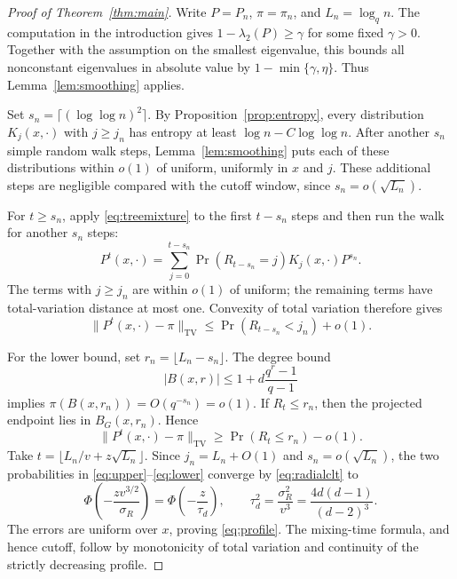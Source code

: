 \documentclass[11pt,reqno]{amsart}
\theoremstyle{definition}
\newcommand{\TV}{\mathrm{TV}}
\begin{document}
\begin{proof}[Proof of Theorem~\ref{thm:main}]
Write $P=P_n$, $\pi=\pi_n$, and $L_n=\log_q n$.
The computation in the introduction gives
$1-\lambda_2(P)\ge\gamma$ for some fixed $\gamma>0$.
Together with the assumption on the smallest eigenvalue, this
bounds all nonconstant eigenvalues in absolute value by
$1-\min\{\gamma,\eta\}$. Thus Lemma~\ref{lem:smoothing} applies.

Set $s_n=\lceil(\log\log n)^2\rceil$.
By Proposition~\ref{prop:entropy}, every distribution
$K_j(x,\cdot)$ with $j\ge j_n$ has entropy at least
$\log n-C\log\log n$. After another $s_n$ simple random walk
steps, Lemma~\ref{lem:smoothing} puts each of these distributions
within $o(1)$ of uniform, uniformly in $x$ and $j$.
These additional steps are negligible compared with the cutoff
window, since $s_n=o(\sqrt{L_n})$.

For $t\ge s_n$, apply \eqref{eq:treemixture} to the first
$t-s_n$ steps and then run the walk for another $s_n$ steps:
\[
 P^t(x,\cdot)
 =\sum_{j=0}^{t-s_n}\Pr(R_{t-s_n}=j)
                       K_j(x,\cdot)P^{s_n}.
\]
The terms with $j\ge j_n$ are within $o(1)$ of uniform;
the remaining terms have total-variation distance at most one.
Convexity of total variation therefore gives
\begin{equation}\label{eq:upper}
 \|P^t(x,\cdot)-\pi\|_{\TV}
 \le\Pr(R_{t-s_n}<j_n)+o(1).
\end{equation}

For the lower bound, set $r_n=\lfloor L_n-s_n\rfloor$.
The degree bound
\[
 |B(x,r)|\le1+d\frac{q^r-1}{q-1}
\]
implies $\pi(B(x,r_n))=O(q^{-s_n})=o(1)$.
If $R_t\le r_n$, then the projected endpoint lies in $B_G(x,r_n)$. Hence
\begin{equation}\label{eq:lower}
 \|P^t(x,\cdot)-\pi\|_{\TV}
 \ge\Pr(R_t\le r_n)-o(1).
\end{equation}
Take $t=\lfloor L_n/v+z\sqrt{L_n}\rfloor$.
Since $j_n=L_n+O(1)$ and $s_n=o(\sqrt{L_n})$,
the two probabilities in \eqref{eq:upper}--\eqref{eq:lower}
converge by \eqref{eq:radialclt} to
\[
 \Phi\left(-\frac{zv^{3/2}}{\sigma_R}\right)
 =\Phi\left(-\frac z{\tau_d}\right),\qquad
 \tau_d^2=\frac{\sigma_R^2}{v^3}
 =\frac{4d(d-1)}{(d-2)^3}.
\]
The errors are uniform over $x$, proving \eqref{eq:profile}.
The mixing-time formula, and hence cutoff, follow by monotonicity
of total variation and continuity of the strictly decreasing profile.
\end{proof}
\end{document}
